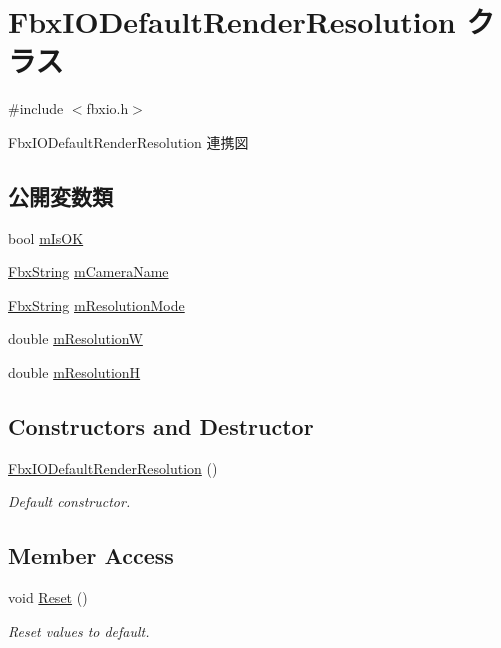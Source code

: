 \hypertarget{class_fbx_i_o_default_render_resolution}{}\section{Fbx\+I\+O\+Default\+Render\+Resolution クラス}
\label{class_fbx_i_o_default_render_resolution}


{\ttfamily \#include $<$fbxio.\+h$>$}



Fbx\+I\+O\+Default\+Render\+Resolution 連携図
\subsection*{公開変数類}
\begin{DoxyCompactItemize}
\item 
bool \hyperlink{class_fbx_i_o_default_render_resolution_ae56f217dc572df5e9fe42f15cca70e6e}{m\+Is\+OK}
\item 
\hyperlink{class_fbx_string}{Fbx\+String} \hyperlink{class_fbx_i_o_default_render_resolution_a02557aa4bb0fbe0cbdc31e721304de97}{m\+Camera\+Name}
\item 
\hyperlink{class_fbx_string}{Fbx\+String} \hyperlink{class_fbx_i_o_default_render_resolution_a9c5e1f0ab623fe67690f95517665ebca}{m\+Resolution\+Mode}
\item 
double \hyperlink{class_fbx_i_o_default_render_resolution_a1d437196200a13c117228782e95102bd}{m\+ResolutionW}
\item 
double \hyperlink{class_fbx_i_o_default_render_resolution_a3d72888dd0b6c5e92163872bb050dc74}{m\+ResolutionH}
\end{DoxyCompactItemize}
\subsection*{Constructors and Destructor}
\begin{DoxyCompactItemize}
\item 
\hyperlink{class_fbx_i_o_default_render_resolution_aba11fab3ca530e3eae26b19d74b5dff5}{Fbx\+I\+O\+Default\+Render\+Resolution} ()
\begin{DoxyCompactList}\small\item\em Default constructor. \end{DoxyCompactList}\end{DoxyCompactItemize}
\subsection*{Member Access}
\begin{DoxyCompactItemize}
\item 
void \hyperlink{class_fbx_i_o_default_render_resolution_a31654b516324bdfe779c458d518ae4d6}{Reset} ()
\begin{DoxyCompactList}\small\item\em Reset values to default. \end{DoxyCompactList}\end{DoxyCompactItemize}


